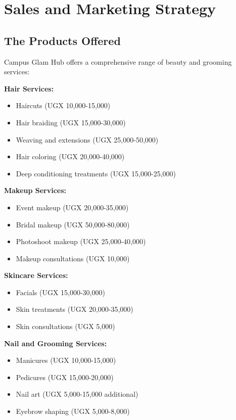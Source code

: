 \documentclass[a4paper,12pt]{article}
\begin{document}
\newpage
\section{Sales and Marketing Strategy}

\subsection{The Products Offered}

Campus Glam Hub offers a comprehensive range of beauty and grooming services:

\textbf{Hair Services:}
\begin{itemize}[leftmargin=2em]
    \item Haircuts (UGX 10,000-15,000)
    \item Hair braiding (UGX 15,000-30,000)
    \item Weaving and extensions (UGX 25,000-50,000)
    \item Hair coloring (UGX 20,000-40,000)
    \item Deep conditioning treatments (UGX 15,000-25,000)
\end{itemize}

\textbf{Makeup Services:}
\begin{itemize}[leftmargin=2em]
    \item Event makeup (UGX 20,000-35,000)
    \item Bridal makeup (UGX 50,000-80,000)
    \item Photoshoot makeup (UGX 25,000-40,000)
    \item Makeup consultations (UGX 10,000)
\end{itemize}

\textbf{Skincare Services:}
\begin{itemize}[leftmargin=2em]
    \item Facials (UGX 15,000-30,000)
    \item Skin treatments (UGX 20,000-35,000)
    \item Skin consultations (UGX 5,000)
\end{itemize}

\textbf{Nail and Grooming Services:}
\begin{itemize}[leftmargin=2em]
    \item Manicures (UGX 10,000-15,000)
    \item Pedicures (UGX 15,000-20,000)
    \item Nail art (UGX 5,000-15,000 additional)
    \item Eyebrow shaping (UGX 5,000-8,000)
\end{itemize}
\end{document}
